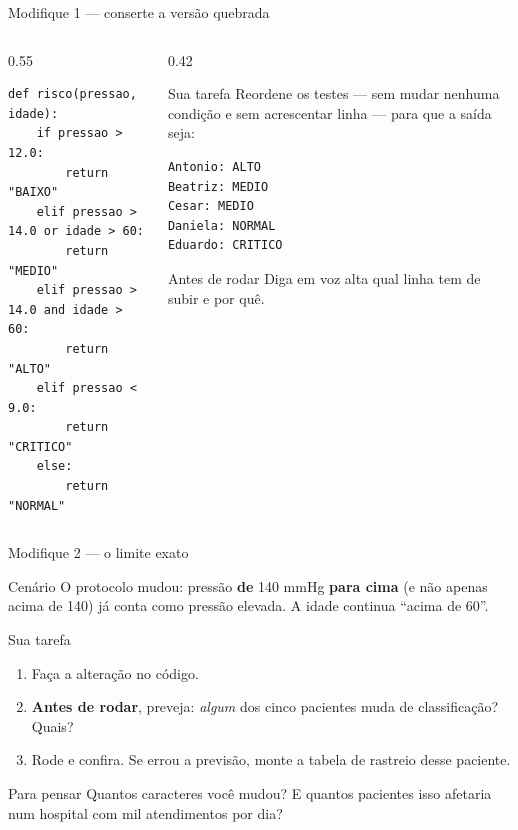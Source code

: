 \documentclass[aspectratio=169]{beamer}
\begin{document}
\begin{frame}[fragile,shrink=8]{Modifique 1 --- conserte a versão quebrada}
  \begin{columns}[T]
    \begin{column}{0.55\textwidth}
\begin{lstlisting}[basicstyle=\ttfamily\tiny]
def risco(pressao, idade):
    if pressao > 12.0:
        return "BAIXO"
    elif pressao > 14.0 or idade > 60:
        return "MEDIO"
    elif pressao > 14.0 and idade > 60:
        return "ALTO"
    elif pressao < 9.0:
        return "CRITICO"
    else:
        return "NORMAL"
\end{lstlisting}
    \end{column}
    \begin{column}{0.42\textwidth}
      \begin{block}{Sua tarefa}
        {\small Reordene os testes --- sem mudar nenhuma condição e
        sem acrescentar linha --- para que a saída seja:}
\begin{lstlisting}[style=saida, basicstyle=\ttfamily\tiny]
Antonio: ALTO
Beatriz: MEDIO
Cesar: MEDIO
Daniela: NORMAL
Eduardo: CRITICO
\end{lstlisting}
      \end{block}
      \begin{exampleblock}{Antes de rodar}
        {\small Diga em voz alta qual linha tem de subir e por quê.}
      \end{exampleblock}
    \end{column}
  \end{columns}
\end{frame}

\begin{frame}[shrink=8]{Modifique 2 --- o limite exato}
  \begin{block}{Cenário}
    {\small O protocolo mudou: pressão \textbf{de} 140 mmHg
    \textbf{para cima} (e não apenas acima de 140) já conta como
    pressão elevada. A idade continua ``acima de 60''.}
  \end{block}

  \vspace{0.15cm}
  \begin{block}{Sua tarefa}
    \small
    \begin{enumerate}
      \item Faça a alteração no código.
      \item \textbf{Antes de rodar}, preveja: \emph{algum} dos cinco
            pacientes muda de classificação? Quais?
      \item Rode e confira. Se errou a previsão, monte a tabela de
            rastreio desse paciente.
    \end{enumerate}
  \end{block}

  \vspace{0.15cm}
  \begin{exampleblock}{Para pensar}
    {\small Quantos caracteres você mudou? E quantos pacientes isso
    afetaria num hospital com mil atendimentos por dia?}
  \end{exampleblock}
\end{frame}
\end{document}
